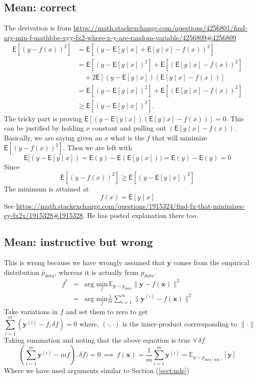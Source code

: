 \documentclass{article}
\newcommand{\beq}{\begin{equation}}
\newcommand{\eeq}{\end{equation}}
\newcommand{\ber}{\begin{eqnarray}}
\newcommand{\eer}{\end{eqnarray}}
\begin{document}
\subsection{Mean: correct}
The derivation is from \url{https://math.stackexchange.com/questions/4256801/find-arg-min-f-mathbbe-xyy-fx2-where-x-y-are-random-variable/4256809#4256809}
\begin{align}
\mathsf{E}[(y-f(x))^2]&=\mathsf{E}[(y-\mathsf{E}[y\mid x]+\mathsf{E}[y\mid x]-f(x))^2] \\
&=\mathsf{E}[(y-\mathsf{E}[y\mid x])^2]+\mathsf{E}[(\mathsf{E}[y\mid x]-f(x))^2] \\
&\quad+2\mathsf{E}[(y-\mathsf{E}[y\mid x])(\mathsf{E}[y\mid x]-f(x))] \\
&=\mathsf{E}[(y-\mathsf{E}[y\mid x])^2]+\mathsf{E}[(\mathsf{E}[y\mid x]-f(x))^2] \\
&\ge \mathsf{E}[(y-\mathsf{E}[y\mid x])^2]. 
\end{align}
The tricky part is proving $\mathsf{E}[(y-\mathsf{E}[y\mid x])(\mathsf{E}[y\mid x]-f(x))]=0$. This can be justified by holding $x$ constant and pulling out $(\mathsf{E}[y\mid x]-f(x))$. Basically, we are saying given an $x$ what is the $f$ that will minimize $\mathsf{E}[(y-f(x))^2]$. Then we are left with
\beq
\mathsf{E}[(y-\mathsf{E}[y\mid x]) = \mathsf{E}(y) - \mathsf{E}(\mathsf{E}[y\mid x])) = \mathsf{E}(y) - \mathsf{E}(y) = 0
\eeq
Since
\beq
\mathsf{E}[(y-f(x))^2] \ge \mathsf{E}[(y-\mathsf{E}[y\mid x])^2]
\eeq
The minimum is attained at
\beq
f(x) = \mathsf{E}[y\mid x]
\eeq
See \url{https://math.stackexchange.com/questions/1915324/find-fx-that-minimizes-ey-fx2x/1915328#1915328}. He has posted explanation there too.  
\subsection{Mean: instructive but wrong}
This is wrong because we have wrongly assumed that $\pmb{y}$ comes from the empirical distribution $\hat{p}_{data}$, whereas it is actually from $p_{data}$.
\ber
f^{*} &=& \text{arg } \underset{f}{\text{min}}\, {\mathbb{E}}_{\pmb{y}\sim{p_{data}}}\|{\pmb{y}}-f(\pmb{x})\|^2 \\
     &=& \text{arg } \underset{f}{\text{min}} \frac{1}{m}\sum_{i=1}^{m}\|{\pmb{y}^{(i)}}-f(\pmb{x})\|^2
\eer
Take variations in $f$ and set them to zero to get
\beq
\sum_{i=1}^{m}(\pmb{y}^{(i)}-f,\delta{f}) = 0 \text{ where, } (\cdot,\cdot) \text{ is the inner-product corrresponding to }\|\cdot\|
\eeq
Taking summation and noting that the above equation is true $\forall\,\delta{f}$
\beq
(\sum_{i=1}^{m}\pmb{y}^{(i)}-mf),\delta{f}) = 0 \, \implies\,f(\pmb{x})=\frac{1}{m}\sum_{i=1}^{m}\pmb{y}^{(i)} = \mathbb{E}_{y\sim{p_{data(\pmb{y}|\pmb{x})}}}[\pmb{y}]
\eeq
Where we have used arguments similar to Section (\ref{sect:mle})
\end{document}
